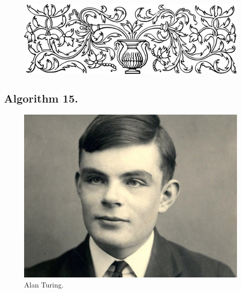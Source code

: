 \documentclass[preview]{standalone}
\begin{document}
\begin{figure}[!h]
    \centering
    \includegraphics[width=14cm]{../resources/jpg/3.1.algorithms/border1.png}
\end{figure}
\subsection[The extrema of a discrete finite set.]{
    \color{section} Algorithm 15.
}

\vspace{1\baselineskip}
\begin{center}
    
\end{center}
\pagebreak
\begin{center}
    
\end{center}
\vspace{3\baselineskip}
\begin{figure}[!h]
    \centering
    \includegraphics[width=14cm]{../resources/jpg/3.1.algorithms/turing.jpg}
    \caption*{Alan Turing.}
\end{figure}
\end{document}
